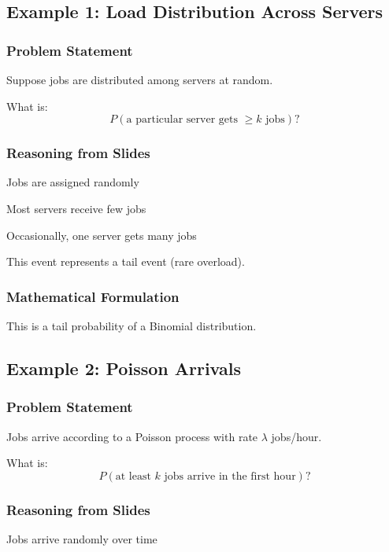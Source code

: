\documentclass[11pt]{article}
\begin{document}
\subsection{Example 1: Load Distribution Across Servers}

\subsubsection{Problem Statement}

Suppose jobs are distributed among servers at random.

What is:
\[
P(\text{a particular server gets } \geq k \text{ jobs})?
\]

\subsubsection{Reasoning from Slides}

Jobs are assigned randomly

Most servers receive few jobs

Occasionally, one server gets many jobs

This event represents a tail event (rare overload).

\subsubsection{Mathematical Formulation}

This is a tail probability of a Binomial distribution.

\subsection{Example 2: Poisson Arrivals}

\subsubsection{Problem Statement}

Jobs arrive according to a Poisson process with rate $\lambda$ jobs/hour.

What is:
\[
P(\text{at least } k \text{ jobs arrive in the first hour})?
\]

\subsubsection{Reasoning from Slides}

Jobs arrive randomly over time
\end{document}
